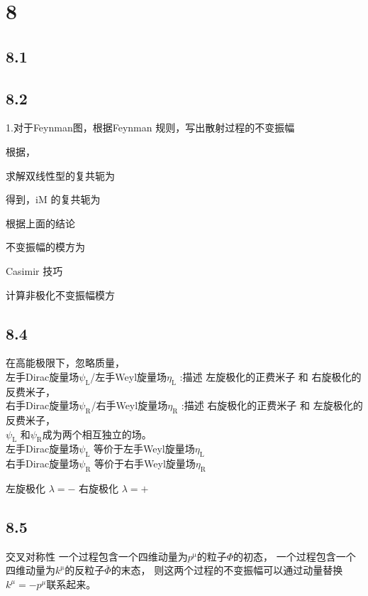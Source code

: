 \section{8}



\subsection{8.1}





\subsection{8.2}


1.对于Feynman图，根据Feynman 规则，写出散射过程的不变振幅

根据，


求解双线性型的复共轭为

得到，iM 的复共轭为


根据上面的结论

不变振幅的模方为


Casimir 技巧


计算非极化不变振幅模方


\subsection{8.4}


在高能极限下，忽略质量，
\\左手Dirac旋量场$\psi_\mathrm{L}$/左手Weyl旋量场$\eta_\mathrm{L}$ :描述 左旋极化的正费米子 和 右旋极化的反费米子，
\\右手Dirac旋量场$\psi_\mathrm{R}$/右手Weyl旋量场$\eta_\mathrm{R}$ :描述 右旋极化的正费米子 和 左旋极化的反费米子，
\\$\psi_\mathrm{L}$ 和$\psi_\mathrm{R}$成为两个相互独立的场。
\\左手Dirac旋量场$\psi_\mathrm{L}$ 等价于左手Weyl旋量场$\eta_\mathrm{L}$ 
\\右手Dirac旋量场$\psi_\mathrm{R}$ 等价于右手Weyl旋量场$\eta_\mathrm{R}$

左旋极化 $\lambda=-$
右旋极化 $\lambda=+$


\subsection{8.5}

交叉对称性
一个过程包含一个四维动量为$p^\mathrm{\mu}$的粒子$\Phi$的初态，
一个过程包含一个四维动量为$k^\mathrm{\mu}$的反粒子$\bar{\Phi}$的末态，
则这两个过程的不变振幅可以通过动量替换$k^\mu=-p^\mu$联系起来。

